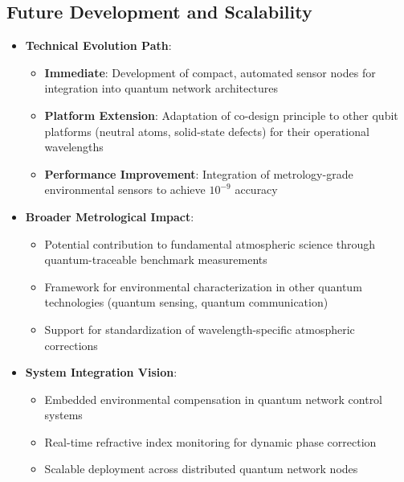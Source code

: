 \documentclass[aip,reprint,groupedaddress,onecolumn,superscriptaddress]{revtex4-2}
\begin{document}
\subsection{Future Development and Scalability}
\begin{itemize}
    \item \textbf{Technical Evolution Path}:
    \begin{itemize}
        \item \textbf{Immediate}: Development of compact, automated sensor nodes for integration into quantum network architectures
        \item \textbf{Platform Extension}: Adaptation of co-design principle to other qubit platforms (neutral atoms, solid-state defects) for their operational wavelengths
        \item \textbf{Performance Improvement}: Integration of metrology-grade environmental sensors to achieve $10^{-9}$ accuracy
    \end{itemize}
    
    \item \textbf{Broader Metrological Impact}:
    \begin{itemize}
        \item Potential contribution to fundamental atmospheric science through quantum-traceable benchmark measurements
        \item Framework for environmental characterization in other quantum technologies (quantum sensing, quantum communication)
        \item Support for standardization of wavelength-specific atmospheric corrections
    \end{itemize}
    
    \item \textbf{System Integration Vision}:
    \begin{itemize}
        \item Embedded environmental compensation in quantum network control systems
        \item Real-time refractive index monitoring for dynamic phase correction
        \item Scalable deployment across distributed quantum network nodes
    \end{itemize}
\end{itemize}
\end{document}

